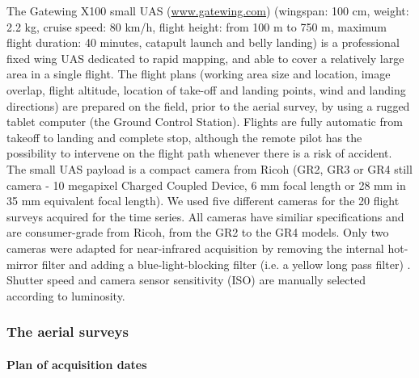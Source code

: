 \documentclass[remotesensing,article,submit,moreauthors,pdftex,12pt,a4paper]{mdpi} %
\begin{document}
The Gatewing X100 small UAS (\url{www.gatewing.com}) (wingspan: 100 cm, weight: 2.2 kg, cruise speed: 80 km/h, flight height: from 100 m to 750 m, maximum flight duration: 40 minutes, catapult launch and belly landing) is a professional fixed wing UAS dedicated to rapid mapping, and able to cover a relatively large area in a single flight. The flight plans (working area size and location, image overlap, flight altitude, location of take-off and landing points, wind and landing directions) are prepared on the field, prior to the aerial survey, by using a rugged tablet computer (the Ground Control Station). Flights are fully automatic from takeoff to landing and complete stop, although the remote pilot has the possibility to intervene on the flight path whenever there is a risk of accident. 
The small UAS payload is a compact camera from Ricoh (GR2, GR3 or GR4 still camera - 10 megapixel Charged Coupled Device, 6 mm focal length or 28 mm in 35 mm equivalent focal length). We used five different cameras for the 20 flight surveys acquired for the time series. All cameras have similiar specifications and are consumer-grade from Ricoh, from the GR2 to the GR4 models. Only two cameras were adapted for near-infrared acquisition by removing the internal hot-mirror filter and adding a blue-light-blocking filter (i.e. a yellow long pass filter) \citep{aber_small-format_2010}. Shutter speed and camera sensor sensitivity (ISO) are manually selected according to luminosity.


\subsubsection{The aerial surveys}

\paragraph{Plan of acquisition dates}
\end{document}
